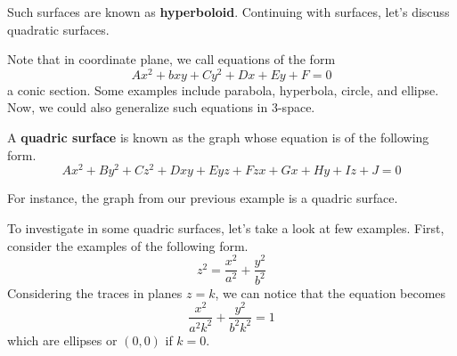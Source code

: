 \documentclass[../../main.tex]{subfiles}
\begin{document}
\begin{solution}
\begin{minipage}{0.46\textwidth}
\begin{figure}[H]
\end{figure}
\end{minipage}
\hfill
\begin{minipage}{0.46\textwidth}
\end{minipage}
\end{solution}

Such surfaces are known as \textbf{hyperboloid}. Continuing with
surfaces, let's discuss quadratic surfaces.

Note that in coordinate plane, we call equations of the form
\[
Ax^2 + bxy + Cy^2 + Dx + Ey + F = 0
\]
a conic section. Some examples include parabola, hyperbola, circle,
and ellipse. Now, we could also generalize such equations in 3-space.

\begin{definition}{}{}
A \textbf{quadric surface} is known as the graph whose equation is
of the following form.
\vspace{-0.8\baselineskip}
\[
Ax^2 + By^2 + Cz^2 + Dxy + Eyz + Fzx + Gx + Hy + Iz + J = 0
\]
\end{definition}

For instance, the graph from our previous example is a quadric
surface.

To investigate in some quadric surfaces, let's take a look at
few examples. First, consider the examples of the following form.
\[
z^2 = \frac{x^2}{a^2} + \frac{y^2}{b^2}
\]
Considering the traces in planes $z = k$, we can notice that the
equation becomes
\[
\frac{x^2}{a^2 k^2} + \frac{y^2}{b^2 k^2} = 1
\]
which are ellipses or $(0, 0)$ if $k = 0$.
\end{document}
